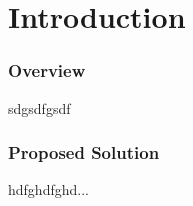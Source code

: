 \section{Introduction}\label{Introduction}

	\subsubsection{Overview}\label{description}
	sdgsdfgsdf
	
	\subsubsection{Proposed Solution}\label{Proposed Solution}
			hdfghdfghd...


